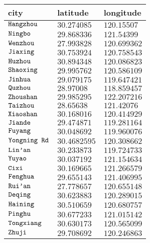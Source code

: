 \begin{longtable}{|l||l|l|} \hline
city & latitude & longitude \\ \hline \hline
$\text{\texttt{Hangzhou}}$ & $30.274085$ & $120.15507$ \\ \hline
$\text{\texttt{Ningbo}}$ & $29.868336$ & $121.54399$ \\ \hline
$\text{\texttt{Wenzhou}}$ & $27.993828$ & $120.699362$ \\ \hline
$\text{\texttt{Jiaxing}}$ & $30.753924$ & $120.758543$ \\ \hline
$\text{\texttt{Huzhou}}$ & $30.894348$ & $120.086823$ \\ \hline
$\text{\texttt{Shaoxing}}$ & $29.995762$ & $120.586109$ \\ \hline
$\text{\texttt{Jinhua}}$ & $29.079175$ & $119.647421$ \\ \hline
$\text{\texttt{Quzhou}}$ & $28.97008$ & $118.859457$ \\ \hline
$\text{\texttt{Zhoushan}}$ & $29.985295$ & $122.207216$ \\ \hline
$\text{\texttt{Taizhou}}$ & $28.65638$ & $121.42076$ \\ \hline
$\text{\texttt{Xiaoshan}}$ & $30.168016$ & $120.414929$ \\ \hline
$\text{\texttt{Jiande}}$ & $29.474871$ & $119.281164$ \\ \hline
$\text{\texttt{Fuyang}}$ & $30.048692$ & $119.960076$ \\ \hline
$\text{\texttt{Yongning{ }Rd}}$ & $30.4682595$ & $120.308662$ \\ \hline
$\text{\texttt{Lin'an}}$ & $30.233873$ & $119.724733$ \\ \hline
$\text{\texttt{Yuyao}}$ & $30.037192$ & $121.154634$ \\ \hline
$\text{\texttt{Cixi}}$ & $30.169665$ & $121.266579$ \\ \hline
$\text{\texttt{Fenghua}}$ & $29.655143$ & $121.406995$ \\ \hline
$\text{\texttt{Rui'an}}$ & $27.778657$ & $120.655148$ \\ \hline
$\text{\texttt{Deqing}}$ & $30.623883$ & $120.289015$ \\ \hline
$\text{\texttt{Haining}}$ & $30.510659$ & $120.680757$ \\ \hline
$\text{\texttt{Pinghu}}$ & $30.677233$ & $121.015142$ \\ \hline
$\text{\texttt{Tongxiang}}$ & $30.630173$ & $120.565099$ \\ \hline
$\text{\texttt{Zhuji}}$ & $29.708692$ & $120.246863$ \\ \hline

\end{longtable}
